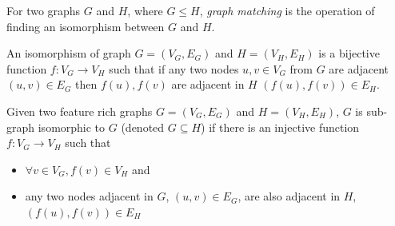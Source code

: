     \begin{definition}\label{def:gmatching}
        For two graphs $G$ and $H$, where $G \leq H$, \textit{graph matching} is the operation of finding an isomorphism between $G$ and $H$.
    \end{definition}

    \begin{definition}\label{def:gisomorphism}
        An isomorphism of graph $G=(V_G,E_G)$ and $H=(V_H,E_H)$ is a bijective function $f:V_G \rightarrow V_H$ such that if any two nodes  $u,v \in V_G$ from $G$ are adjacent $(u,v) \in E_G$ then $f(u), f(v)$ are adjacent in $H$ $(f(u), f(v)) \in E_H $.
    \end{definition}

    \begin{definition}\label{def:sgisomorphism}
           Given two feature rich graphs $G=(V_G,E_G)$ and $H=(V_H,E_H)$, $G$ is sub-graph isomorphic to $G$ (denoted $G \subseteq H$) if there is an injective function $f:V_G \rightarrow V_H$ such that
       \begin{itemize}
           \item $\forall v \in V_G, f(v) \in V_H$ and
           \item any two nodes adjacent in $G$, $(u,v) \in E_G$, are also adjacent in $H$, $(f(u), f(v)) \in E_H $
       \end{itemize}
    \end{definition}


